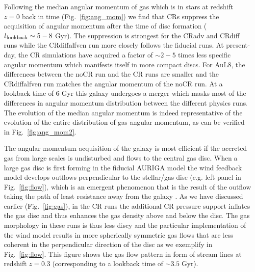 \documentclass[useAMS,usenatbib]{mnras}
\begin{document}
Following the median angular momentum of gas which is in stars at redshift $z=0$ back in time (Fig.\ \ref{fig:ang_mom}) we find that CRs suppress the acquisition of angular momentum after the time of disc formation ($t_{\rm lookback}\sim5-8$ Gyr). The suppression is strongest for the CRadv and CRdiff runs while the CRdiffalfven run more closely follows the fiducial runs. At present-day, the CR simulations have acquired a factor of $\sim2-5$ times less specific angular momentum which manifests itself in more compact discs. For AuL8, the differences between the noCR run and the CR runs are smaller and the CRdiffalfven run matches the angular momentum of the noCR run. At a lookback time of $6$ Gyr this galaxy undergoes a merger which masks most of the differences in angular momentum distribution between the different physics runs. The evolution of the median angular momentum is indeed representative of the evolution of the entire distribution of gas angular momentum, as can be verified in Fig.~\ref{fig:ang_mom2}.

The angular momentum acquisition of the galaxy is most efficient if the accreted gas from large scales is undisturbed and flows to the central gas disc. When a large gas disc is first forming in the fiducial AURIGA model the wind feedback model develops outflows perpendicular to the stellar/gas disc (e.g. left panel in Fig.\ \ref{fig:flow}), which is an emergent phenomenon that is the result of the outflow taking the path of least resistance away from the galaxy \citep{Grand2019}. As we have discussed earlier (Fig.\ \ref{fig:gas}), in the CR runs the additional CR pressure support inflates the gas disc and thus enhances the gas density above and below the disc. The gas morphology in these runs is thus less discy and the particular implementation of the wind model results in more spherically symmetric gas flows that are less coherent in the perpendicular direction of the disc as we exemplify in Fig.\ \ref{fig:flow}. This figure shows the gas flow pattern in form of stream lines at redshift $z=0.3$ (corresponding to a lookback time of $\sim3.5$ Gyr).
\end{document}
